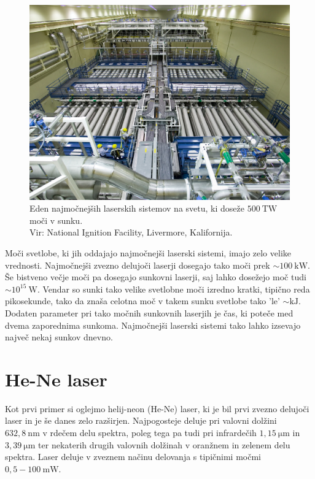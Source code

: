 \begin{figure}[h!]
\centering
\includegraphics[width=100truemm]{slike/07_NIF_Laser_Bay.jpg}
\caption{Eden najmočnejših laserskih sistemov na svetu, ki doseže 
$500~\si{\tera\watt}$ moči v sunku. \\Vir: National Ignition Facility, Livermore, Kalifornija.}
\label{fig:NIF}
\end{figure}

Moči svetlobe, ki jih oddajajo najmočnejši laserski sistemi, imajo zelo velike
vrednosti. Najmočnejši zvezno delujoči laserji dosegajo tako moči prek 
$\sim 100~\si{\kilo\watt}$. Še bistveno večje moči pa dosegajo sunkovni laserji, 
saj lahko dosežejo moč tudi $\sim 10^{15}~\si{\watt}$. 
Vendar so sunki tako velike svetlobne moči izredno kratki, tipično reda pikosekunde, tako da
znaša celotna moč v takem sunku svetlobe tako 'le' $\sim \si{\kilo\joule}$. Dodaten 
parameter pri tako močnih sunkovnih laserjih je čas, ki poteče med dvema zaporednima
sunkoma. Najmočnejši laserski sistemi tako lahko izsevajo največ nekaj sunkov dnevno. 

\section{He-Ne laser}

Kot prvi primer si oglejmo helij-neon (He-Ne) laser, ki je bil prvi zvezno 
delujoči laser in je še danes zelo razširjen. Najpogosteje deluje 
pri valovni dolžini $632,8~\si{\nano\metre}$ v rdečem delu spektra, poleg 
tega pa tudi pri infrardečih $1,15~\si{\micro\metre}$ in 
$3,39~\si{\micro\metre}$ ter nekaterih drugih
valovnih dolžinah v oranžnem in zelenem delu spektra. Laser deluje v zveznem 
načinu delovanja s tipičnimi močmi $0,5 - 100~\si{\milli\watt}$.

